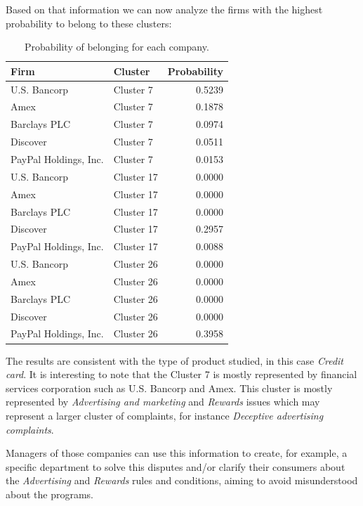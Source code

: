 \documentclass[article]{jss}
\begin{document}
Based on that information we can now analyze the firms with the highest
probability to belong to these clusters:

\begin{table}[ht]
\centering
\begingroup\fontsize{9pt}{10pt}\selectfont
\begin{tabular}{llr}
  \hline
Firm & Cluster & Probability \\ 
  \hline
U.S. Bancorp & Cluster 7 & 0.5239 \\ 
  Amex & Cluster 7 & 0.1878 \\ 
  Barclays PLC & Cluster 7 & 0.0974 \\ 
  Discover & Cluster 7 & 0.0511 \\ 
  PayPal Holdings, Inc. & Cluster 7 & 0.0153 \\ 
  U.S. Bancorp & Cluster 17 & 0.0000 \\ 
  Amex & Cluster 17 & 0.0000 \\ 
  Barclays PLC & Cluster 17 & 0.0000 \\ 
  Discover & Cluster 17 & 0.2957 \\ 
  PayPal Holdings, Inc. & Cluster 17 & 0.0088 \\ 
  U.S. Bancorp & Cluster 26 & 0.0000 \\ 
  Amex & Cluster 26 & 0.0000 \\ 
  Barclays PLC & Cluster 26 & 0.0000 \\ 
  Discover & Cluster 26 & 0.0000 \\ 
  PayPal Holdings, Inc. & Cluster 26 & 0.3958 \\ 
   \hline
\end{tabular}
\endgroup
\caption{Probability of belonging for each company.} 
\end{table}

The results are consistent with the type of product studied, in this
case \emph{Credit card}. It is interesting to note that the Cluster 7 is
mostly represented by financial services corporation such as U.S.
Bancorp and Amex. This cluster is mostly represented by
\emph{Advertising and marketing} and \emph{Rewards} issues which may
represent a larger cluster of complaints, for instance \emph{Deceptive
advertising complaints}.

Managers of those companies can use this information to create, for
example, a specific department to solve this disputes and/or clarify
their consumers about the \emph{Advertising} and \emph{Rewards} rules
and conditions, aiming to avoid misunderstood about the programs.
\end{document}
